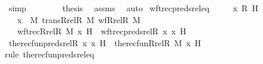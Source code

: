 \begin{isabellebody}
\ simp\isanewline
\ \ \isamarkupfalse%
\isanewline
\ \ \isamarkupfalse%
\ \isamarkupfalse%
\ {\isacharquery}{\kern0pt}thesis\ \isamarkupfalse%
\ assms\ \isamarkupfalse%
\ auto\isanewline
{}\isamarkupfalse%
%
\endisatagproof
{\isafoldproof}%
%
\isadelimproof
\isanewline
%
\endisadelimproof
\isanewline
{}\isamarkupfalse%
\ wftrec{\isacharunderscore}{\kern0pt}preds{\isacharunderscore}{\kern0pt}rel{\isacharunderscore}{\kern0pt}eq\ {\isacharcolon}{\kern0pt}\ \isanewline
\ \ \ x\ R\ H\isanewline
\ \ \ {\isachardoublequoteopen}x\ {\isasymin}\ M{\isachardoublequoteclose}\ {\isachardoublequoteopen}trans{\isacharparenleft}{\kern0pt}Rrel{\isacharparenleft}{\kern0pt}R{\isacharcomma}{\kern0pt}\ M{\isacharparenright}{\kern0pt}{\isacharparenright}{\kern0pt}{\isachardoublequoteclose}\ {\isachardoublequoteopen}wf{\isacharparenleft}{\kern0pt}Rrel{\isacharparenleft}{\kern0pt}R{\isacharcomma}{\kern0pt}\ M{\isacharparenright}{\kern0pt}{\isacharparenright}{\kern0pt}{\isachardoublequoteclose}\isanewline
\ \ \ {\isachardoublequoteopen}wftrec{\isacharparenleft}{\kern0pt}Rrel{\isacharparenleft}{\kern0pt}R{\isacharcomma}{\kern0pt}\ M{\isacharparenright}{\kern0pt}{\isacharcomma}{\kern0pt}\ x{\isacharcomma}{\kern0pt}\ H{\isacharparenright}{\kern0pt}\ {\isacharequal}{\kern0pt}\ wftrec{\isacharparenleft}{\kern0pt}preds{\isacharunderscore}{\kern0pt}rel{\isacharparenleft}{\kern0pt}R{\isacharcomma}{\kern0pt}\ x{\isacharparenright}{\kern0pt}{\isacharcomma}{\kern0pt}\ x{\isacharcomma}{\kern0pt}\ H{\isacharparenright}{\kern0pt}{\isachardoublequoteclose}\ \isanewline
%
\isadelimproof
%
\endisadelimproof
%
\isatagproof
{}\isamarkupfalse%
\ {\isacharminus}{\kern0pt}\isanewline
\ \ \isamarkupfalse%
\ {\isachardoublequoteopen}the{\isacharunderscore}{\kern0pt}recfun{\isacharparenleft}{\kern0pt}preds{\isacharunderscore}{\kern0pt}rel{\isacharparenleft}{\kern0pt}R{\isacharcomma}{\kern0pt}\ x{\isacharparenright}{\kern0pt}{\isacharcomma}{\kern0pt}\ x{\isacharcomma}{\kern0pt}\ H{\isacharparenright}{\kern0pt}\ {\isacharequal}{\kern0pt}\ the{\isacharunderscore}{\kern0pt}recfun{\isacharparenleft}{\kern0pt}Rrel{\isacharparenleft}{\kern0pt}R{\isacharcomma}{\kern0pt}\ M{\isacharparenright}{\kern0pt}{\isacharcomma}{\kern0pt}\ x{\isacharcomma}{\kern0pt}\ H{\isacharparenright}{\kern0pt}{\isachardoublequoteclose}\ \isanewline
\ \ \ \ \isamarkupfalse%
{\isacharparenleft}{\kern0pt}rule\ the{\isacharunderscore}{\kern0pt}recfun{\isacharunderscore}{\kern0pt}preds{\isacharunderscore}{\kern0pt}rel{\isacharunderscore}{\kern0pt}eq{\isacharparenright}{\kern0pt}\isanewline

\end{isabellebody}
